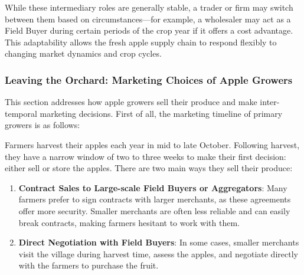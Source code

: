 While these intermediary roles are generally stable, a trader or firm may switch between them based on circumstances---for example, a wholesaler may act as a Field Buyer during certain periods of the crop year if it offers a cost advantage. This adaptability allows the fresh apple supply chain to respond flexibly to changing market dynamics and crop cycles.




\subsubsection{Leaving the Orchard: Marketing Choices of Apple Growers}
This section addresses how apple growers sell their produce and make inter-temporal marketing decisions. First of all, the marketing timeline of primary growers is as follows: 



Farmers harvest their apples each year in mid to late October. Following harvest, they have a narrow window of two to three weeks to make their first decision: either sell or store the apples. There are two main ways they sell their produce:

\begin{enumerate}
    \item \textbf{Contract Sales to Large-scale Field Buyers or Aggregators}: Many farmers prefer to sign contracts with larger merchants, as these agreements offer more security. Smaller merchants are often less reliable and can easily break contracts, making farmers hesitant to work with them.
    \item \textbf{Direct Negotiation with Field Buyers}: In some cases, smaller merchants visit the village during harvest time, assess the apples, and negotiate directly with the farmers to purchase the fruit.
\end{enumerate}

